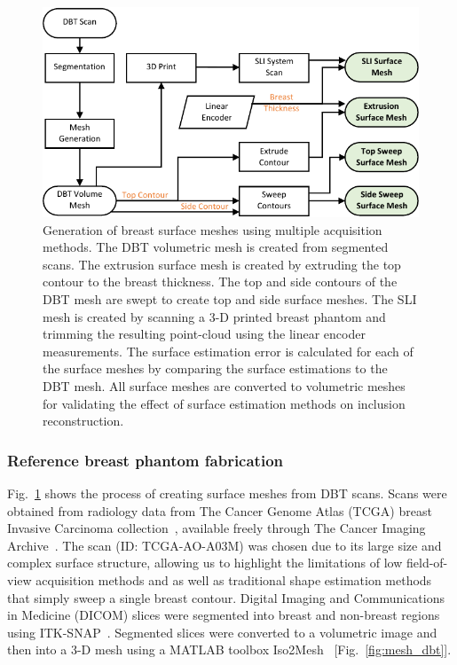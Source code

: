 \begin{figure}
    \begin{center}
    \includegraphics[width=.9\textwidth]{fig/omci/mesh_flowchart2.pdf}
    \end{center}
    \caption{Generation of breast surface meshes using multiple acquisition methods. The DBT volumetric mesh is created from segmented scans. The extrusion surface mesh is created by extruding the top contour to the breast thickness. The top and side contours of the DBT mesh are swept to create top and side surface meshes. The SLI mesh is created by scanning a 3-D printed breast phantom and trimming the resulting point-cloud using the linear encoder measurements. The surface estimation error is calculated for each of the surface meshes by comparing the surface estimations to the DBT mesh. All surface meshes are converted to volumetric meshes for validating the effect of surface estimation methods on inclusion reconstruction.}
    \label{fig:mesh_flowchart}
\end{figure} 

\subsubsection{Reference breast phantom fabrication}
Fig.~\ref{fig:mesh_flowchart} shows the process of creating surface meshes from DBT scans. Scans were obtained from radiology data from The Cancer Genome Atlas (TCGA) breast Invasive Carcinoma collection~\cite{Lingle2016}, available freely through The Cancer Imaging Archive~\cite{Clark2013}. The scan (ID: TCGA-AO-A03M) was chosen due to its large size and complex surface structure, allowing us to highlight the limitations of low field-of-view acquisition methods and as well as traditional shape estimation methods that simply sweep a single breast contour.  Digital Imaging and Communications in Medicine (DICOM) slices were segmented into breast and non-breast regions using ITK-SNAP~\cite{Yushkevich2006}. Segmented slices were converted to a volumetric image and then into a 3-D mesh using a MATLAB toolbox Iso2Mesh~\cite{Fang2009} [Fig.~\ref{fig:mesh_dbt}].

